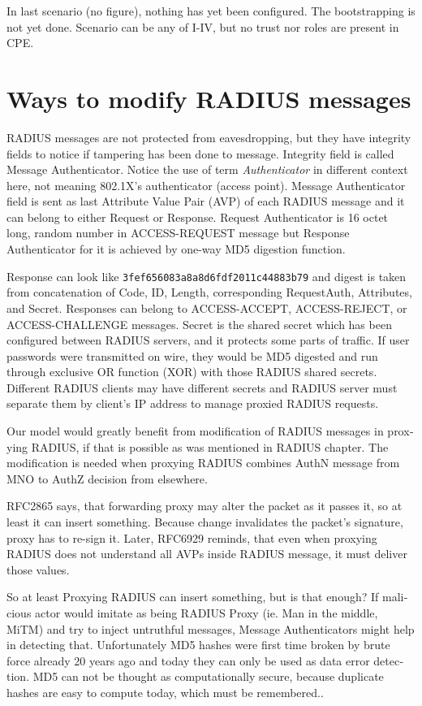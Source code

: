 \documentclass[12pt,a4paper,english]{tutthesis}
\begin{document}
\begin{otherlanguage}{english}
In last scenario (no figure), nothing has yet been configured. The bootstrapping
is not yet done. Scenario can be any of I-IV, but 
no trust nor roles are present in CPE.
\section{Ways to modify RADIUS messages}
\label{sec-4-6}
RADIUS messages are not protected from eavesdropping, but they have
integrity fields to notice if tampering has been done to message.  
Integrity field is called Message Authenticator.
Notice the use of term \emph{Authenticator} in different context here, not
meaning 802.1X's authenticator (access point).
Message Authenticator field is sent as last Attribute Value Pair (AVP)
of each RADIUS message and it can belong 
to either Request or Response.\cite[p.20]{radiusbook}
Request Authenticator is 16 octet long, random number in
ACCESS-REQUEST message but Response Authenticator for it is achieved
by one-way MD5 digestion function. 

Response can look like \texttt{3fef656083a8a8d6fdf2011c44883b79} and digest
is taken from concatenation of Code, ID, Length, corresponding
Request\-Auth, Attributes, and Secret. Responses can belong to
ACCESS-ACCEPT, ACCESS-REJECT, or ACCESS-CHALLENGE messages.  Secret
is the shared secret which has been configured between RADIUS servers,
and it protects some parts of traffic. If user passwords were
transmitted on wire, they would be MD5 digested and run through
exclusive OR function (XOR) with those RADIUS shared secrets.  Different RADIUS clients may have different
secrets and RADIUS server must separate them by client's IP address to
manage proxied RADIUS requests.\cite{radiusbook}


Our model would greatly benefit from modification of RADIUS messages in proxying
RADIUS, if that is possible as was mentioned in RADIUS chapter.
The modification is needed when proxying RADIUS combines AuthN message
from MNO to AuthZ decision from elsewhere.





RFC2865\cite{rfc2865} says, that forwarding proxy may alter the packet
as it passes it, so at least it can insert something.
Because change invalidates the packet's signature, proxy has to
re-sign it. Later, RFC6929\cite{rfc6929} reminds, that even when
proxying RADIUS does not understand all AVPs inside RADIUS message, it
must deliver those values.


So at least Proxying RADIUS can insert something, but is that enough?
If malicious actor would imitate as being RADIUS Proxy (ie. Man in the
middle, MiTM) and try
to inject untruthful messages, Message Authenticators might help in detecting
that. Unfortunately MD5 hashes were first time broken by brute force
already 20 years ago and today they can only be used as data error
detection\cite[p.2]{rfc6151}. MD5 can not be thought as computationally secure,
because duplicate hashes are easy to compute today, which must be
remembered.\cite{xie2013fast}. 





\end{otherlanguage}
\end{document}
